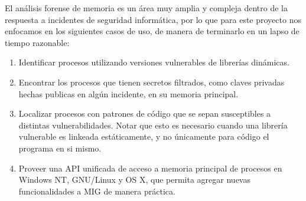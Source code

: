 El análisis forense de memoria es un área muy amplia y compleja dentro de la
respuesta a incidentes de seguridad informática, por lo que para este proyecto
nos enfocamos en los siguientes casos de uso, de manera de terminarlo en un
lapso de tiempo razonable:

\begin{enumerate}

\item Identificar procesos utilizando versiones vulnerables de librerías
    dinámicas.

\item Encontrar los procesos que tienen secretos filtrados, como claves
    privadas hechas publicas en algún incidente, en su memoria principal.

\item Localizar procesos con patrones de código que se sepan susceptibles a
    distintas vulnerabilidades. Notar que esto es necesario cuando una librería
    vulnerable es linkeada estáticamente, y no únicamente para código el
    programa en si mismo.

\item Proveer una API unificada de acceso a memoria principal de procesos en
    Windows NT, GNU/Linux y OS X, que permita agregar nuevas funcionalidades a
    MIG de manera práctica.

\end{enumerate}

